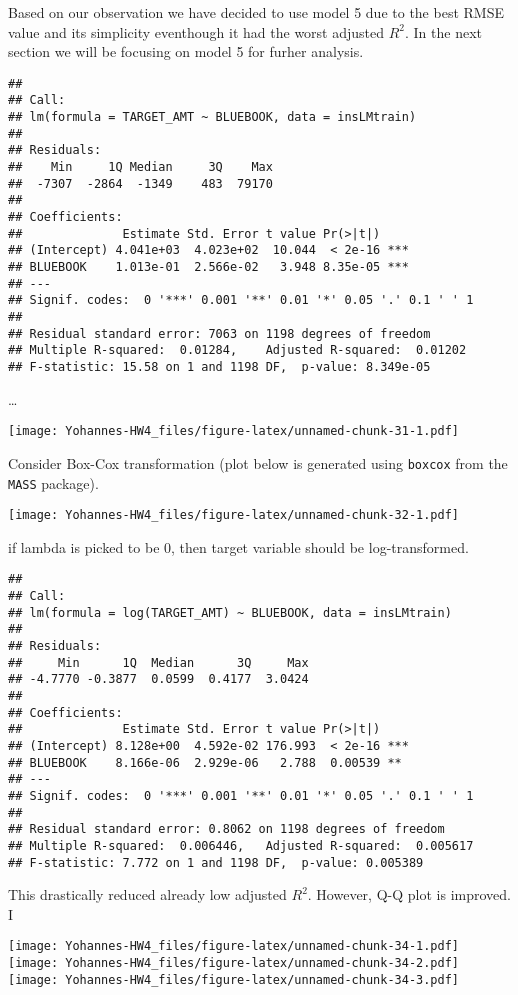 \documentclass[]{article}
\begin{document}
Based on our observation we have decided to use model 5 due to the best
RMSE value and its simplicity eventhough it had the worst adjusted
\(R^2\). In the next section we will be focusing on model 5 for furher
analysis.

\begin{verbatim}
## 
## Call:
## lm(formula = TARGET_AMT ~ BLUEBOOK, data = insLMtrain)
## 
## Residuals:
##    Min     1Q Median     3Q    Max 
##  -7307  -2864  -1349    483  79170 
## 
## Coefficients:
##              Estimate Std. Error t value Pr(>|t|)    
## (Intercept) 4.041e+03  4.023e+02  10.044  < 2e-16 ***
## BLUEBOOK    1.013e-01  2.566e-02   3.948 8.35e-05 ***
## ---
## Signif. codes:  0 '***' 0.001 '**' 0.01 '*' 0.05 '.' 0.1 ' ' 1
## 
## Residual standard error: 7063 on 1198 degrees of freedom
## Multiple R-squared:  0.01284,    Adjusted R-squared:  0.01202 
## F-statistic: 15.58 on 1 and 1198 DF,  p-value: 8.349e-05
\end{verbatim}

\ldots{}

\texttt{[image: Yohannes-HW4\_files/figure-latex/unnamed-chunk-31-1.pdf]}

Consider Box-Cox transformation (plot below is generated using
\texttt{boxcox} from the \texttt{MASS} package).

\texttt{[image: Yohannes-HW4\_files/figure-latex/unnamed-chunk-32-1.pdf]}

if lambda is picked to be 0, then target variable should be
log-transformed.

\begin{verbatim}
## 
## Call:
## lm(formula = log(TARGET_AMT) ~ BLUEBOOK, data = insLMtrain)
## 
## Residuals:
##     Min      1Q  Median      3Q     Max 
## -4.7770 -0.3877  0.0599  0.4177  3.0424 
## 
## Coefficients:
##              Estimate Std. Error t value Pr(>|t|)    
## (Intercept) 8.128e+00  4.592e-02 176.993  < 2e-16 ***
## BLUEBOOK    8.166e-06  2.929e-06   2.788  0.00539 ** 
## ---
## Signif. codes:  0 '***' 0.001 '**' 0.01 '*' 0.05 '.' 0.1 ' ' 1
## 
## Residual standard error: 0.8062 on 1198 degrees of freedom
## Multiple R-squared:  0.006446,   Adjusted R-squared:  0.005617 
## F-statistic: 7.772 on 1 and 1198 DF,  p-value: 0.005389
\end{verbatim}

This drastically reduced already low adjusted \(R^2\). However, Q-Q plot
is improved. I

\texttt{[image: Yohannes-HW4\_files/figure-latex/unnamed-chunk-34-1.pdf]}
\texttt{[image: Yohannes-HW4\_files/figure-latex/unnamed-chunk-34-2.pdf]}
\texttt{[image: Yohannes-HW4\_files/figure-latex/unnamed-chunk-34-3.pdf]}
\end{document}
